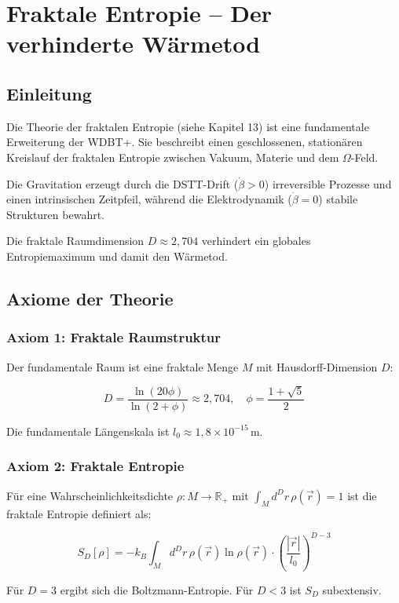 \chapter{Fraktale Entropie – Der verhinderte Wärmetod}

\section{Einleitung}

Die Theorie der fraktalen Entropie (siehe Kapitel 13) ist eine fundamentale Erweiterung 
der WDBT+. Sie beschreibt einen geschlossenen, stationären Kreislauf der fraktalen 
Entropie zwischen Vakuum, Materie und dem $\Omega$-Feld.

Die Gravitation erzeugt durch die DSTT-Drift ($\dot{\beta} > 0$) irreversible Prozesse 
und einen intrinsischen Zeitpfeil, während die Elektrodynamik ($\dot{\beta} = 0$) 
stabile Strukturen bewahrt.

Die fraktale Raumdimension $D \approx 2,704$ verhindert ein globales Entropiemaximum 
und damit den Wärmetod.

\section{Axiome der Theorie}

\subsection{Axiom 1: Fraktale Raumstruktur}

Der fundamentale Raum ist eine fraktale Menge $M$ mit Hausdorff-Dimension $D$:

\[
D = \frac{\ln(20\phi)}{\ln(2 + \phi)} \approx 2,704, \quad \phi = \frac{1 + \sqrt{5}}{2} \tag{M.1}
\]

Die fundamentale Längenskala ist $l_0 \approx 1,8 \times 10^{-15}\,\text{m}$.

\subsection{Axiom 2: Fraktale Entropie}

Für eine Wahrscheinlichkeitsdichte $\rho: M \to \mathbb{R}_+$ mit 
$\int_M d^D r \, \rho(\vec{r}) = 1$ ist die fraktale Entropie definiert als:

\[
S_D[\rho] = -k_B \int_M d^D r \, \rho(\vec{r}) \ln \rho(\vec{r}) \cdot \left( \frac{|\vec{r}|}{l_0} \right)^{D-3} \tag{M.2}
\]

Für $D = 3$ ergibt sich die Boltzmann-Entropie. Für $D < 3$ ist $S_D$ subextensiv.

